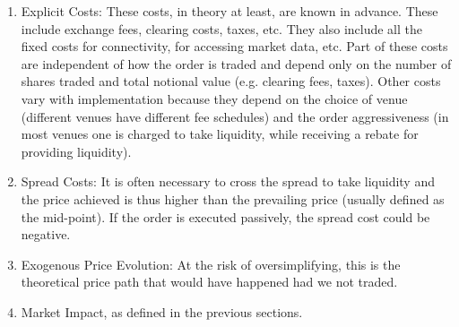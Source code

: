 \begin{enumerate}
\item Explicit Costs: These costs, in theory at least, are known in advance. These include exchange fees, clearing costs, taxes, etc. They also include all the fixed costs for connectivity, for accessing market data, etc. Part of these costs are independent of how the order is traded and depend only on the number of shares traded and total notional value (e.g. clearing fees, taxes). Other costs vary with implementation because they depend on the choice of venue (different venues have different fee schedules) and the order aggressiveness (in most venues one is charged to take liquidity, while receiving a rebate for providing liquidity).

\item Spread Costs: It is often necessary to cross the spread to take liquidity and the price achieved is thus higher than the prevailing price (usually defined as the mid-point). If the order is executed passively, the spread cost could be negative.




\item Exogenous Price Evolution: At the risk of oversimplifying, this is the theoretical price path that would have happened had we not traded.

\item Market Impact, as defined in the previous sections.  
\end{enumerate}


